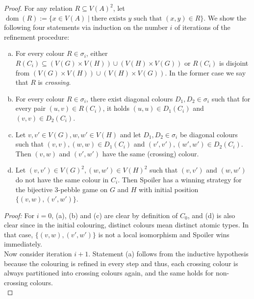 \documentclass[a4paper,UKenglish,cleveref, autoref, thm-restate]{lipics-v2021}
\newcommand{\lra}{\longrightarrow}
\newcommand{\dom}{\operatorname{dom}}
\begin{document}
\begin{proof}
			For any relation $R \subseteq V(A)^2$, let $\dom(R) := \{x \in V(A) \mid \text{there exists } y \text{ such that }(x,y) \in R \}$. We show the following four statements via induction on the number $i$ of iterations of the refinement procedure:
			\begin{enumerate}[(a)]
				\item For every colour $R \in \sigma_i$, either $R(C_i) \subseteq (V(G) \times V(H)) \cup (V(H) \times V(G))$ or $R(C_i)$ is disjoint from $(V(G) \times V(H)) \cup (V(H) \times V(G))$. In the former case we say that $R$ is \emph{crossing}.
				\item For every colour $R \in \sigma_i$, there exist diagonal colours $D_1,D_2 \in \sigma_i$ such that for every pair $(u,v) \in R(C_i)$, it holds $(u,u) \in D_1(C_i)$ and $(v,v) \in D_2(C_i)$.
				\item Let $v,v' \in V(G), w,w' \in V(H)$ and let $D_1,D_2 \in \sigma_i$ be diagonal colours such that $(v,v), (w,w) \in D_1(C_i)$ and $(v',v'), (w',w') \in D_2(C_i)$. Then $(v,w)$ and $(v',w')$ have the same (crossing) colour.
				\item Let $(v,v') \in V(G)^2, (w,w') \in V(H)^2$ such that $(v,v')$ and $(w,w')$ do not have the same colour in $C_i$. Then Spoiler has a winning strategy for the bijective 3-pebble game on $G$ and $H$ with initial position $\{(v,w),(v',w')\}$.
			\end{enumerate}	 
		
			\textit{Proof:} For $i=0$, (a), (b) and (c) are clear by definition of $C_0$, and (d) is also clear since in the initial colouring, distinct colours mean distinct atomic types. In that case, $\{(v,w),(v',w')\}$ is not a local isomorphism and Spoiler wins immediately.\\
			
			Now consider iteration $i+1$. Statement (a) follows from the inductive hypothesis because the colouring is refined in every step and thus, each crossing colour is always partitioned into crossing colours again, and the same holds for non-crossing colours.\\
			

\end{proof}
\end{document}
